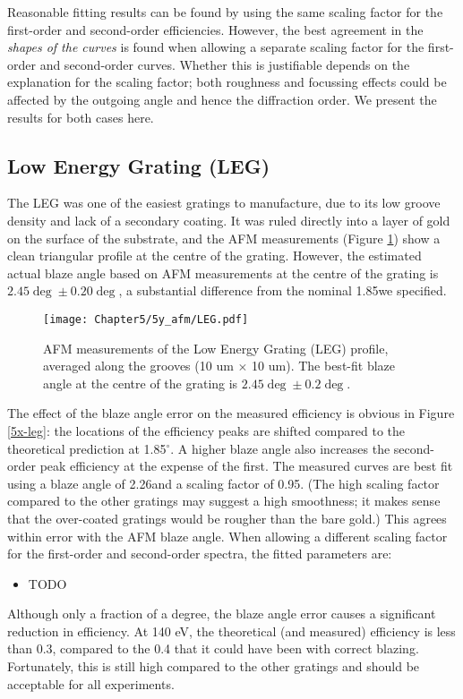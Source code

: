 Reasonable fitting results can be found by using the same scaling factor for the first-order and second-order efficiencies.  However, the best agreement in the \emph{shapes of the curves} is found when allowing a separate scaling factor for the first-order and second-order curves.  Whether this is justifiable depends on the explanation for the scaling factor; both roughness and focussing effects could be affected by the outgoing angle and hence the diffraction order.  We present the results for both cases here.
\subsection{Low Energy Grating (LEG)}
The LEG was one of the easiest gratings to manufacture, due to its low groove density and lack of a secondary coating.  It was ruled directly into a layer of gold on the surface of the substrate, and the AFM measurements (Figure \ref{5y-leg}) show a clean triangular profile at the centre of the grating.  However, the estimated actual blaze angle based on AFM measurements at the centre of the grating is $2.45\deg \pm 0.20\deg$, a substantial difference from the nominal 1.85\dg we specified.

\begin{figure}[htbp] %
   \centering
   \texttt{[image: Chapter5/5y\_afm/LEG.pdf]} 
   \caption{AFM measurements of the Low Energy Grating (LEG) profile, averaged along the grooves (10 um $\times$ 10 um).  The best-fit blaze angle at the centre of the grating is $2.45\deg \pm 0.2\deg$.}
   \label{5y-leg}
\end{figure}
The effect of the blaze angle error on the measured efficiency is obvious in Figure \ref{5x-leg}: the locations of the efficiency peaks are shifted compared to the theoretical prediction at 1.85$^\circ$.  A higher blaze angle also increases the second-order peak efficiency at the expense of the first.
The measured curves are best fit using a blaze angle of 2.26\dg and a scaling factor of 0.95.  (The high scaling factor compared to the other gratings may suggest a high smoothness; it makes sense that the over-coated gratings would be rougher than the bare gold.)  This agrees within error with the AFM blaze angle.  When allowing a different scaling factor for the first-order and second-order spectra, the fitted parameters are:
\begin{itemize}
\item TODO
\end{itemize}
Although only a fraction of a degree, the blaze angle error causes a significant reduction in efficiency.  At 140 eV, the theoretical (and measured) efficiency is less than 0.3, compared to the 0.4 that it could have been with correct blazing.  Fortunately, this is still high compared to the other gratings and should be acceptable for all experiments.

